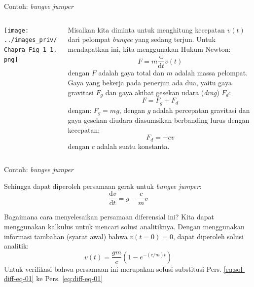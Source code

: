 

\begin{frame}{Contoh: \emph{bungee jumper}}

\fontsize{9pt}{10pt}\selectfont

\begin{columns}

\begin{column}{0.2\textwidth}

\texttt{[image: ../images\_priv/Chapra\_Fig\_1\_1.png]}

\end{column}

\begin{column}{0.8\textwidth}
Misalkan kita diminta untuk menghitung kecepatan $v(t)$ dari pelompat
\emph{bungee} yang sedang terjun. Untuk mendapatkan ini, kita
menggunakan Hukum Newton:
\begin{equation*}
F = m \frac{\mathrm{d}}{\mathrm{d}t} v(t)
\end{equation*}
dengan $F$ adalah gaya total dan $m$ adalah massa pelompat.
Gaya yang bekerja pada penerjun ada dua, yaitu gaya gravitasi \(F_{g}\) dan
gaya akibat gesekan udara (\emph{drag})
$F_{d}$:
\begin{equation*}
F = F_{g} + F_{d}
\end{equation*}
dengan: $F_{g} = mg$, dengan $g$ adalah percepatan gravitasi dan gaya
gesekan diudara diasumsikan berbanding lurus dengan kecepatan:
\begin{equation*}
F_{d} = -c v  
\end{equation*}
dengan $c$ adalah suatu konstanta.
\end{column}

\end{columns}

\end{frame}


\begin{frame}{Contoh: \emph{bungee jumper}}

Sehingga dapat diperoleh persamaan gerak untuk \emph{bungee jumper}:
\begin{equation}
\frac{\mathrm{d}v}{\mathrm{d}t} = g - \frac{c}{m}v
\label{eq:diff-eq-01}
\end{equation}

Bagaimana cara menyelesaikan persamaan diferensial ini? Kita dapat
menggunakan kalkulus untuk mencari solusi analitiknya. Dengan
menggunakan informasi tambahan (syarat awal) bahwa $v(t=0)=0$, dapat
diperoleh solusi analitik:
\begin{equation}
v(t) = \frac{gm}{c}\left( 1 - e^{-(c/m)t} \right)
\label{eq:sol-diff-eq-01}
\end{equation}
Untuk verifikasi bahwa
persamaan ini merupakan solusi substitusi
Pers. \eqref{eq:sol-diff-eq-01} ke Pers. \eqref{eq:diff-eq-01}
\end{frame}



